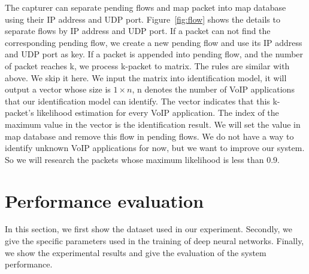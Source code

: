 \documentclass[conference]{IEEEtran}
\begin{document}
The capturer can separate pending flows and map packet into map database using their IP address and UDP port. Figure~\ref{fig:flow} shows the details to separate flows by IP address and UDP port. If a packet can not find the corresponding pending flow, we create a new pending flow and use its IP address and UDP port as key. If a packet is appended into pending flow, and the number of packet reaches k, we process k-packet to matrix. The rules are similar with above. We skip it here. We input the matrix into identification model, it will output a vector whose size is $1 \times n$,  n denotes the number of VoIP applications that our identification model can identify. The vector indicates that this k-packet's likelihood estimation for every VoIP application. The index of the maximum value in the vector is the identification result. We will set the value in map database and remove this flow in pending flows. We do not have a way to identify unknown VoIP applications for now, but we want to improve our system. So we will research the packets whose maximum likelihood is less than 0.9.





\section{Performance evaluation}
\label{sec:performanceevaluation}
In this section, we first show the dataset used in our experiment. Secondly, we give the specific parameters used in the training of deep neural networks. Finally, we show the experimental results and give the evaluation of the system performance.
\end{document}
